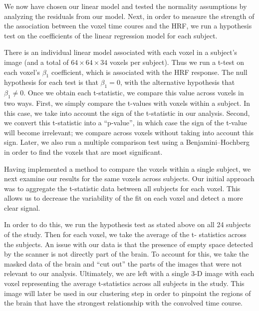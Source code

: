 
\par \indent We now have chosen our linear model and tested the normality
assumptions by analyzing the residuals from our model. Next, in order to
measure the strength of the association between the voxel time coures and the
HRF, we run a hypothesis test on the coefficients of the linear regression
model for each subject.

\par There is an individual linear model associated with each voxel in a
subject’s image (and a total of $64 \times 64 \times 34$ voxels per subject).
Thus we run a t-test on each voxel's $\beta_1$ coefficient, which is associated
with the HRF response. The null hypothesis for each test is that $ \beta_1=
0$, with the alternative hypothesis that $\beta_1 \neq 0$. Once we obtain
each t-statistic, we compare this value across voxels in two ways. First, we
simply compare the t-values with voxels within a subject. In this case, we
take into account the sign of the t-statistic in our analysis. Second, we
convert this t-statistic into a ``p-value'', in which case the sign of the
t-value will become irrelevant; we compare across voxels without taking
into account this sign. Later, we also run a multiple comparison test using a
Benjamini–Hochberg in order to find the voxels that are most significant.

\par Having implemented a method to compare the voxels within a single subject,
we next examine our results for the same voxels across subjects. Our initial
approach was to aggregate the t-statistic data between all subjects for each
voxel. This allows us to decrease the variability of the fit on each voxel and
detect a more clear signal.

\par In order to do this, we run the hypothesis test as stated above on all 24
subjects of the study. Then for each voxel, we take the average of the t-
statistics across the subjects. An issue with our data is that the presence of
empty space detected by the scanner is not directly part of the brain. To
account for this, we take the masked data of the brain and ``cut out'' the
parts of the images that were not relevant to our analysis. Ultimately, we are
left with a single 3-D image with each voxel representing the average
t-statistics across all subjects in the study. This image will later be used in
our clustering step in order to pinpoint the regions of the brain that have the
strongest relationship with the convolved time course.
